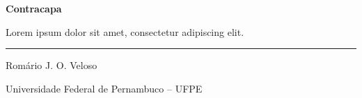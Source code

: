 {
\begin{frame}[plain]
  \begin{center}
    \vfill
    \marcaInstitucional{1.55cm}\par
    \vspace{0.35cm}
    {\color{RoxoPrincipal}\LARGE\bfseries Contracapa}\par
    \vspace{0.30cm}
    {\large Lorem ipsum dolor sit amet, consectetur adipiscing elit.}\par
    \vspace{0.65cm}
    {\color{MalvaDestaque}\rule{0.28\textwidth}{2pt}}\par
    \vspace{0.60cm}
    {\large Romário J. O. Veloso}\par
    {\small Universidade Federal de Pernambuco -- UFPE}
    \vfill
  \end{center}
\end{frame}
}